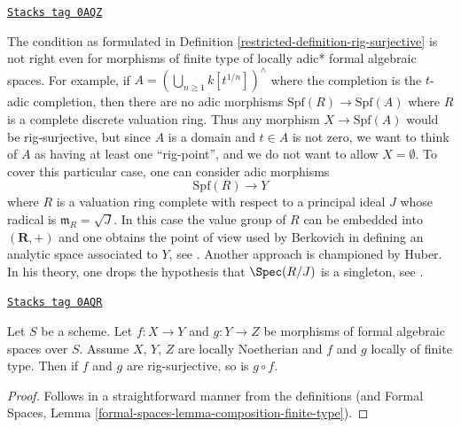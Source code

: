 \begin{remark}
\label{restricted-remark-rig-surjective-more-general}
\href{https://stacks.math.columbia.edu/tag/0AQZ}{\texttt{Stacks tag 0AQZ}}

The condition as formulated in Definition \ref{restricted-definition-rig-surjective}
is not right even for morphisms of finite type
of locally adic* formal algebraic spaces.
For example, if $A = (\bigcup_{n \geq 1} k[t^{1/n}])^\wedge$
where the completion is the $t$-adic completion, then
there are no adic morphisms $\text{Spf}(R) \to \text{Spf}(A)$
where $R$ is a complete discrete valuation ring.
Thus any morphism $X \to \text{Spf}(A)$ would be rig-surjective,
but since $A$ is a domain and $t \in A$ is not zero, we want to
think of $A$ as having at least one ``rig-point'', and we do not
want to allow $X = \emptyset$. To cover this
particular case, one can consider adic morphisms
$$
\text{Spf}(R) \longrightarrow Y
$$
where $R$ is a valuation ring complete with respect to a principal
ideal $J$ whose radical is $\mathfrak m_R = \sqrt{J}$.
In this case the value group of $R$ can be embedded into
$(\mathbf{R}, +)$ and one obtains the point of view used by
Berkovich in defining an analytic space associated to $Y$, see
\cite{Berkovich}. Another approach is championed by Huber. In his theory,
one drops the hypothesis that $\Spec(R/J)$ is a singleton, see
\cite{Huber-continuous-valuations}.
\end{remark}

\begin{lemma}
\label{restricted-lemma-composition-rig-surjective}
\href{https://stacks.math.columbia.edu/tag/0AQR}{\texttt{Stacks tag 0AQR}}


Let $S$ be a scheme. Let $f : X \to Y$ and $g : Y \to Z$ be morphisms of formal
algebraic spaces over $S$. Assume $X$, $Y$, $Z$ are locally Noetherian and
$f$ and $g$ locally of finite type. Then if $f$ and $g$ are rig-surjective,
so is $g \circ f$.
\end{lemma}

\begin{proof}
Follows in a straightforward manner from the definitions
(and Formal Spaces, Lemma \ref{formal-spaces-lemma-composition-finite-type}).
\end{proof}

